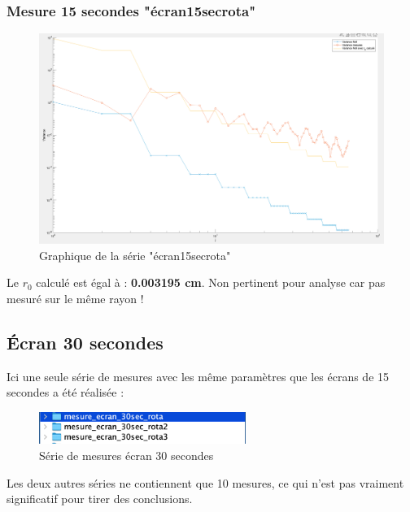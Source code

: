 \subsubsection{Mesure 15 secondes "écran\textunderscore15sec\textunderscore rota"}
\begin{figure}[H]
    \centering
    \includegraphics[width = \textwidth]{assets/figures/mesures/mesure_15_sec_rota_plot.png}
    \caption{Graphique de la série "écran\textunderscore15sec\textunderscore rota"}
\end{figure}
Le \textbf{$r_0$} calculé est égal à : \textbf{0.003195 cm}. \color{red} Non pertinent pour analyse car pas mesuré sur le même rayon !\color{black}

\subsection{Écran 30 secondes}
Ici une seule série de mesures avec les même paramètres que les écrans de 15 secondes a été réalisée :
\begin{figure}[H]
    \centering
    \includegraphics[width = 0.6\textwidth]{assets/figures/mesures/serie_mesures_30_sec_1.png}
    \caption{Série de mesures écran 30 secondes}
\end{figure}
Les deux autres séries ne contiennent que 10 mesures, ce qui n'est pas vraiment significatif pour tirer des conclusions.

